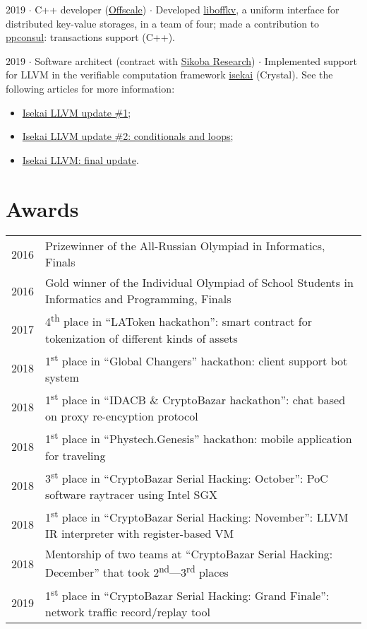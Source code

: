 \documentclass[10pt]{article}
\begin{document}
\medskip

2019 $\cdot$ C++ developer (\href{https://offscale.io}{Offscale}) $\cdot$ Developed \href{https://github.com/offscale/liboffkv}{liboffkv}, a uniform interface for distributed key-value storages, in a team of four; made a contribution to \href{https://github.com/oliora/ppconsul}{ppconsul}: transactions support (C++).

\medskip

2019 $\cdot$ Software architect (contract with \href{https://research.sikoba.com}{Sikoba Research}) $\cdot$ Implemented support for LLVM in the verifiable computation framework \href{https://github.com/sikoba/isekai}{isekai} (Crystal).
See the following articles for more information:
\begin{itemize}
    \item \href{https://medium.com/sikoba-network/isekai-technical-update-llvm-d5003fc8f009}{Isekai LLVM update \#1};
    \item \href{https://medium.com/sikoba-network/isekai-llvm-update-2-conditionals-and-loops-81296a0eccbf}{Isekai LLVM update \#2: conditionals and loops};
    \item \href{https://medium.com/sikoba-network/isekai-llvm-final-update-894fb6863fcf}{Isekai LLVM: final update}.
\end{itemize}
\medskip

\section{Awards}

\begin{tabular}{ l l }
    2016 & Prizewinner of the All-Russian Olympiad in Informatics, Finals \\
    2016 & Gold winner of the Individual Olympiad of School Students in Informatics and Programming, Finals \\
    2017 & 4\textsuperscript{th} place in ``LAToken hackathon'': smart contract for tokenization of different kinds of assets \\
    2018 & 1\textsuperscript{st} place in ``Global Changers'' hackathon: client support bot system \\
    2018 & 1\textsuperscript{st} place in ``IDACB \& CryptoBazar hackathon'': chat based on proxy re-encyption protocol \\
    2018 & 1\textsuperscript{st} place in ``Phystech.Genesis'' hackathon: mobile application for traveling \\
    2018 & 3\textsuperscript{st} place in ``CryptoBazar Serial Hacking: October'': PoC software raytracer using Intel SGX \\
    2018 & 1\textsuperscript{st} place in ``CryptoBazar Serial Hacking: November'': LLVM IR interpreter with register-based VM \\
    2018 & Mentorship of two teams at ``CryptoBazar Serial Hacking: December'' that took 2\textsuperscript{nd}---3\textsuperscript{rd} places \\
    2019 & 1\textsuperscript{st} place in ``CryptoBazar Serial Hacking: Grand Finale'': network traffic record/replay tool \\
\end{tabular}
\end{document}
